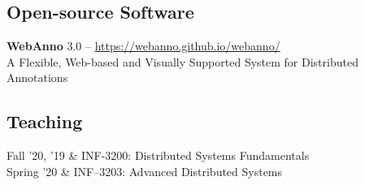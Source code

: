 \documentclass[11pt, a4paper]{article}
\newcommand{\Duration}[2]{\fontsize{10pt}{0}\selectfont #1--#2}
\newcommand{\Year}[1]{\fontsize{10pt}{0}\selectfont #1}
\begin{document}
\subsection*{Open-source Software}
\textbf{WebAnno} 3.0 -- \href{https://webanno.github.io/webanno/}{https://webanno.github.io/webanno/}
\\
A Flexible, Web-based and Visually Supported System for Distributed Annotations
\iffalse
\\
\textbf{osm2pgrouting} -- \href{https://github.com/aakashysharma/osm2pgrouting}{https://github.com/aakashysharma/osm2pgrouting}
\\
Import tool for OpenStreetMap data to pgRouting database including version and timestamp
\\[0.3cm]

\fi



\subsection*{Teaching}



\begin{EntriesTable}
	\Year{Fall '20, '19} &
	INF-3200: Distributed Systems Fundamentals
	\\
	\Year{Spring '20} &
	INF--3203: Advanced Distributed Systems 
\end{EntriesTable}
\end{document}
